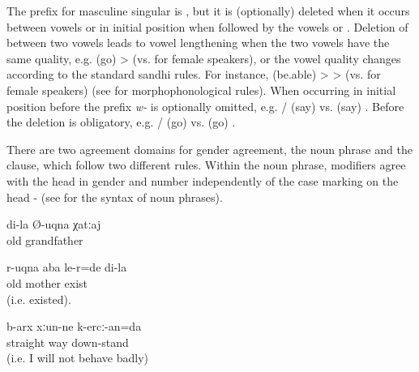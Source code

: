The prefix for masculine singular is , but it is (optionally) deleted when it occurs between vowels or in initial position when followed by the vowels  or . Deletion of  between two vowels leads to vowel lengthening when the two vowels have the same quality, e.g.  (go) >   (vs.  for female speakers), or the vowel quality changes according to the standard sandhi rules. For instance,  (be.able) >  >   (vs.  for female speakers) (see  for morphophonological rules). When occurring in initial position before  the prefix \textit{w-} is optionally omitted, e.g. \slash{} (say) vs.  (say) . Before  the deletion is obligatory, e.g. \slash{} (go) vs.  (go) .

There are two agreement domains for gender agreement, the noun phrase and the clause, which follow two different rules. Within the noun phrase, modifiers agree with the head in gender and number independently of the case marking on the head -  (see  for the syntax of noun phrases).
%
\begin{exe}
	\ex	\label{ex:agreement number}
	\begin{xlist}
		\TabPositions{13em}
		\ex	{} 	\tab	{} 	\label{ex:agreement number@A}
		\ex	{} 	\tab	{} 	\label{ex:agreement number@B}
		\ex	{} 		\tab	{} 		\label{ex:agreement number@C}
	\end{xlist}

	\ex	\label{ex:my old grandfather agreement}
	\gll	di-la	Ø-uqna	χatːaj\\
			old	grandfather\\
	\glt	{}

	\ex	\label{ex:‎‎My old mother was alive agreement}
	\gll	r-uqna	aba	le-r=de	di-la\\
		old	mother	exist	\\
	\glt	{} (i.e. existed).

	\ex	\label{ex:I will be on the straight road agreement}
	\gll	b-arx	xːun-ne	k-ercː-an=da\\
		straight	way	down-stand\\
	\glt	{} (i.e. I will not behave badly)
\end{exe}

